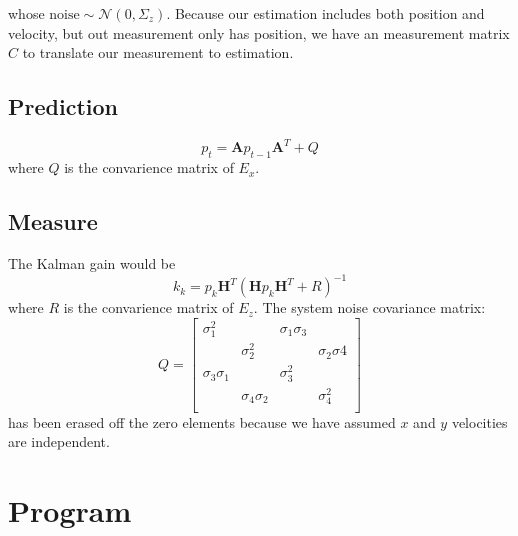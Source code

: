 \documentclass[12pt]{article}
\begin{document}
	whose $\text{noise}\sim\mathcal{N}\left(0,\Sigma_z\right)$. Because our estimation includes both position and velocity, but out measurement only has position, we have an measurement matrix $C$ to translate our measurement to estimation.

	\subsection{Prediction}\label{sub:predict}
	\begin{equation}
		p_t=\mathbf{A}p_{t-1}\mathbf{A}^T+Q
	\end{equation}
	where $Q$ is the convarience matrix of $E_x$.

	\subsection{Measure}\label{sub:measure}
	The Kalman gain would be
	\begin{equation}
		k_k=p_k\mathbf{H}^T{\left(\mathbf{H}p_k\mathbf{H}^T+R\right)}^{-1}
	\end{equation}
	where $R$ is the convarience matrix of $E_z$. The system noise covariance matrix:
	\begin{equation}
		Q=
		\begin{bmatrix}
			\sigma_1^2       &                  & \sigma_1\sigma_3 &                 \\
			                 & \sigma_2^2       &                  & \sigma_2\sigma4 \\
			\sigma_3\sigma_1 &                  & \sigma_3^2       &                 \\
			                 & \sigma_4\sigma_2 &                  & \sigma_4^2      \\
		\end{bmatrix}
	\end{equation}
	has been erased off the zero elements because we have assumed $x$ and $y$ velocities are independent.
	\section{Program}\label{sec:program}
\end{document}
